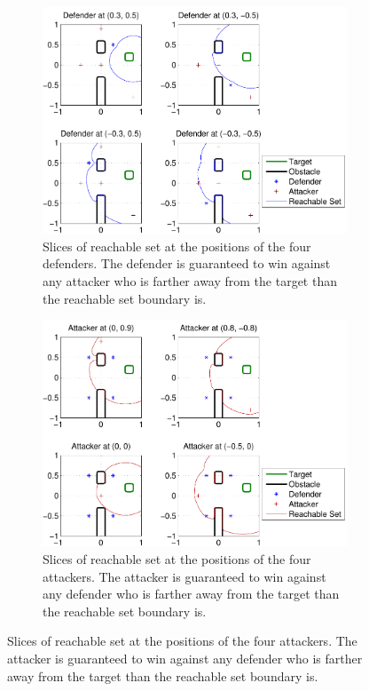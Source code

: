 \begin{figure}[H]
\centering
	\begin{subfigure}{0.45\textwidth}
	\centering
	\includegraphics[width=\textwidth]{"fig/fixed defender 1"}
	\caption{Slices of reachable set at the positions of the four defenders. The defender is guaranteed to win against any attacker who is farther away from the target than the reachable set boundary is.}
	\label{subfig:fixed_d_1}
	\end{subfigure}	
	
	\begin{subfigure}{0.45\textwidth}
	\centering
	\includegraphics[width=\textwidth]{"fig/fixed attacker 1"}
	\caption{Slices of reachable set at the positions of the four attackers. The attacker is guaranteed to win against any defender who is farther away from the target than the reachable set boundary is.}
	\label{subfig:fixed_a_1}
	\end{subfigure}
\end{figure}

